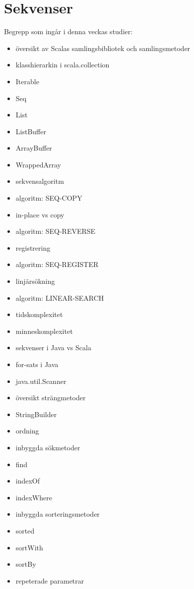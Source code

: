 \chapter{Sekvenser}\label{chapter:W07}
Begrepp som ingår i denna veckas studier:
\begin{multicols}{2}\begin{itemize}[noitemsep,label={$\square$},leftmargin=*]
\item översikt av Scalas samlingsbibliotek och samlingsmetoder
\item klasshierarkin i scala.collection
\item Iterable
\item Seq
\item List
\item ListBuffer
\item ArrayBuffer
\item WrappedArray
\item sekvensalgoritm
\item algoritm: SEQ-COPY
\item in-place vs copy
\item algoritm: SEQ-REVERSE
\item registrering
\item algoritm: SEQ-REGISTER
\item linjärsökning
\item algoritm: LINEAR-SEARCH
\item tidskomplexitet
\item minneskomplexitet
\item sekvenser i Java vs Scala
\item for-sats i Java
\item java.util.Scanner
\item översikt strängmetoder
\item StringBuilder
\item ordning
\item inbyggda sökmetoder
\item find
\item indexOf
\item indexWhere
\item inbyggda sorteringsmetoder
\item sorted
\item sortWith
\item sortBy
\item repeterade parametrar\end{itemize}\end{multicols}
